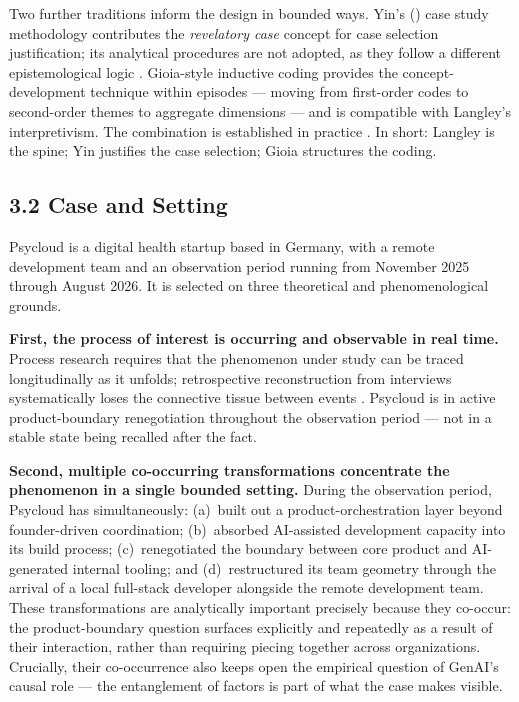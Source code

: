 \documentclass[11pt,a4paper]{article}
\begin{document}
Two further traditions inform the design in bounded ways. Yin's (\citeyear{yin2018case}) case study methodology contributes the \emph{revelatory case} concept for case selection justification; its analytical procedures are not adopted, as they follow a different epistemological logic \citep{gehman2018finding}. Gioia-style inductive coding \citep{gioia2013seeking} provides the concept-development technique within episodes --- moving from first-order codes to second-order themes to aggregate dimensions --- and is compatible with Langley's interpretivism. The combination is established in practice \citep{monazzam2024erm}. In short: Langley is the spine; Yin justifies the case selection; Gioia structures the coding.

\subsection*{3.2 Case and Setting}


Psycloud is a digital health startup based in Germany, with a remote development team and an observation period running from November 2025 through August 2026. It is selected on three theoretical and phenomenological grounds.

\textbf{First, the process of interest is occurring and observable in real time.} Process research requires that the phenomenon under study can be traced longitudinally as it unfolds; retrospective reconstruction from interviews systematically loses the connective tissue between events \citep{langley1999strategies}. Psycloud is in active product-boundary renegotiation throughout the observation period --- not in a stable state being recalled after the fact.

\textbf{Second, multiple co-occurring transformations concentrate the phenomenon in a single bounded setting.} During the observation period, Psycloud has simultaneously: (a)~built out a product-orchestration layer beyond founder-driven coordination; (b)~absorbed AI-assisted development capacity into its build process; (c)~renegotiated the boundary between core product and AI-generated internal tooling; and (d)~restructured its team geometry through the arrival of a local full-stack developer alongside the remote development team. These transformations are analytically important precisely because they co-occur: the product-boundary question surfaces explicitly and repeatedly as a result of their interaction, rather than requiring piecing together across organizations. Crucially, their co-occurrence also keeps open the empirical question of GenAI's causal role --- the entanglement of factors is part of what the case makes visible.
\end{document}
